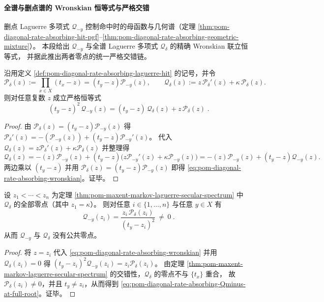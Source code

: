 \paragraph{全谱与删点谱的 Wronskian 恒等式与严格交错}
删点 Laguerre 多项式 \(\mathcal Q_{-y}\) 控制命中时的母函数与几何谱（定理 \ref{thm:pom-diagonal-rate-absorbing-hit-pgf}--\ref{thm:pom-diagonal-rate-absorbing-geometric-mixture}）。
本段给出 \(\mathcal Q_{-y}\) 与全谱 Laguerre 多项式 \(\mathcal Q_\delta\) 的精确 Wronskian 联立恒等式，
并据此推出两者零点的统一严格交错链。

\begin{proposition}\label{prop:pom-diagonal-rate-absorbing-wronskian-identity}
沿用定义 \ref{def:pom-diagonal-rate-absorbing-laguerre-hit} 的记号，并令
\[
\mathcal P_\delta(z):=\prod_{x\in X}(t_x-z)=(t_y-z)\mathcal P_{-y}(z),
\qquad
\mathcal Q_\delta(z):=z\,\mathcal P_\delta'(z)+\kappa\,\mathcal P_\delta(z).
\]
则对任意复数 \(z\) 成立严格恒等式
\begin{equation}\label{eq:pom-diagonal-rate-absorbing-wronskian}
\boxed{\;
(t_y-z)^2\,\mathcal Q_{-y}(z)
=(t_y-z)\,\mathcal Q_\delta(z)+z\,\mathcal P_\delta(z)\; } .
\end{equation}
\end{proposition}
\begin{proof}
由 \(\mathcal P_\delta(z)=(t_y-z)\mathcal P_{-y}(z)\) 得
\(
\mathcal P_\delta'(z)=-(\mathcal P_{-y}(z))+(t_y-z)\mathcal P_{-y}'(z)
\)。
代入 \(\mathcal Q_\delta(z)=z\mathcal P_\delta'(z)+\kappa\mathcal P_\delta(z)\) 并整理得
\[
\mathcal Q_\delta(z)
=-(z)\mathcal P_{-y}(z)+(t_y-z)\bigl(z\mathcal P_{-y}'(z)+\kappa\mathcal P_{-y}(z)\bigr)
=-(z)\mathcal P_{-y}(z)+(t_y-z)\mathcal Q_{-y}(z).
\]
两边乘以 \((t_y-z)\) 并用 \(\mathcal P_\delta(z)=(t_y-z)\mathcal P_{-y}(z)\) 即得 \eqref{eq:pom-diagonal-rate-absorbing-wronskian}。证毕。
\end{proof}

\begin{corollary}[全谱零点处的删点值评估]\label{cor:pom-diagonal-rate-absorbing-evaluate-at-full-roots}
设 \(z_1<\cdots<z_n\) 为定理 \ref{thm:pom-maxent-markov-laguerre-secular-spectrum} 中 \(\mathcal Q_\delta\) 的全部零点（其中 \(z_1=\kappa\)）。
则对任意 \(i\in\{1,\dots,n\}\) 与任意 \(y\in X\) 有
\begin{equation}\label{eq:pom-diagonal-rate-absorbing-Qminus-at-full-root}
\boxed{\;
\mathcal Q_{-y}(z_i)=\frac{z_i\,\mathcal P_\delta(z_i)}{(t_y-z_i)^2}\ \ne\ 0\; } .
\end{equation}
从而 \(\mathcal Q_{-y}\) 与 \(\mathcal Q_\delta\) 没有公共零点。
\end{corollary}
\begin{proof}
将 \(z=z_i\) 代入 \eqref{eq:pom-diagonal-rate-absorbing-wronskian} 并用 \(\mathcal Q_\delta(z_i)=0\) 得
\(
(t_y-z_i)^2\mathcal Q_{-y}(z_i)=z_i\mathcal P_\delta(z_i)
\)。
由定理 \ref{thm:pom-maxent-markov-laguerre-secular-spectrum} 的交错性，\(\mathcal Q_\delta\) 的零点不与 \(\{t_x\}\) 重合，
故 \(\mathcal P_\delta(z_i)\ne 0\)，并且 \(t_y\ne z_i\)，从而得到 \eqref{eq:pom-diagonal-rate-absorbing-Qminus-at-full-root}。证毕。
\end{proof}

